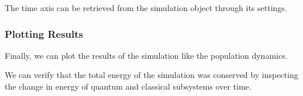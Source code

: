\documentclass[letterpaper,10pt,english]{sphinxmanual}
\begin{document}
\sphinxAtStartPar
The time axis can be retrieved from the simulation object through its settings.

\begin{sphinxVerbatim}[commandchars=\\\{\}]
  
\end{sphinxVerbatim}


\subsubsection{Plotting Results}
\label{\detokenize{user_guide/quickstart/quickstart:plotting-results}}
\sphinxAtStartPar
Finally, we can plot the results of the simulation like the population dynamics.

\begin{sphinxVerbatim}[commandchars=\\\{\}]
 \PYG{p}{[} \PYG{p}{]} 
 \PYG{p}{[} \PYG{p}{]} 
\end{sphinxVerbatim}


\sphinxAtStartPar
We can verify that the total energy of the simulation was conserved by inspecting the change in energy of quantum and classical subsystems over time.
\end{document}
